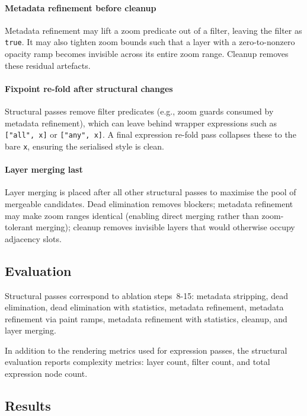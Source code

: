 \paragraph{Metadata refinement before cleanup}
Metadata refinement may lift a zoom predicate out of a filter, leaving the filter as \texttt{true}.
It may also tighten zoom bounds such that a layer with a zero-to-nonzero opacity ramp becomes invisible across its entire zoom range.
Cleanup removes these residual artefacts.

\paragraph{Fixpoint re-fold after structural changes}
Structural passes remove filter predicates (e.g., zoom guards consumed by metadata refinement), which can leave behind wrapper expressions such as \texttt{["all",~x]} or \texttt{["any",~x]}.
A final expression re-fold pass collapses these to the bare \texttt{x}, ensuring the serialised style is clean.

\paragraph{Layer merging last}
Layer merging is placed after all other structural passes to maximise the pool of mergeable candidates.
Dead elimination removes blockers; metadata refinement may make zoom ranges identical (enabling direct merging rather than zoom-tolerant merging); cleanup removes invisible layers that would otherwise occupy adjacency slots.

\subsection{Evaluation}\label{sub_structural_evaluation}

Structural passes correspond to ablation steps~8-15: metadata stripping, dead elimination, dead elimination with statistics, metadata refinement, metadata refinement via paint ramps, metadata refinement with statistics, cleanup, and layer merging.

In addition to the rendering metrics used for expression passes, the structural evaluation reports complexity metrics: layer count, filter count, and total expression node count.

\subsection{Results}\label{sub_structural_results}

